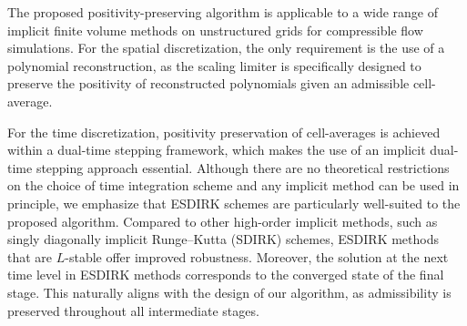 

The proposed positivity-preserving algorithm is applicable to a wide range of implicit finite volume methods on unstructured grids for compressible flow simulations. For the spatial discretization, the only requirement is the use of a polynomial reconstruction, as the scaling limiter is specifically designed to preserve the positivity of reconstructed polynomials given an admissible cell-average.

For the time discretization, positivity preservation of cell-averages is achieved within a dual-time stepping framework, which makes the use of an implicit dual-time stepping approach essential. Although there are no theoretical restrictions on the choice of time integration scheme and any implicit method can be used in principle, we emphasize that ESDIRK schemes are particularly well-suited to the proposed algorithm. Compared to other high-order implicit methods, such as singly diagonally implicit Runge–Kutta (SDIRK) schemes, ESDIRK methods that are $L$-stable offer improved robustness. Moreover, the solution at the next time level in ESDIRK methods corresponds to the converged state of the final stage. This naturally aligns with the design of our algorithm, as admissibility is preserved throughout all intermediate stages.



